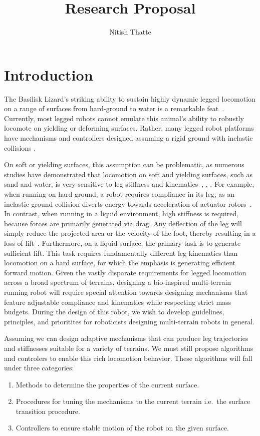 \documentclass{article}
\title{Research Proposal}
\author{Nitish Thatte}
\begin{document}
\maketitle

\section*{Introduction}
The Basilisk Lizard's striking ability to sustain highly dynamic legged locomotion on a range of surfaces from hard-ground to water is a remarkable feat~\cite{glasheen1996a}. Currently, most legged robots cannot emulate this animal's ability to robustly locomote on yielding or deforming surfaces. Rather, many legged robot platforms have mechanisms and controllers designed assuming a rigid ground with inelastic collisions \cite{phantom}. 

On soft or yielding surfaces, this assumption can be problematic, as numerous studies have demonstrated that locomotion on soft and yielding surfaces, such as sand and water, is very sensitive to leg stiffness and kinematics~\cite{Ferris1998}, \cite{Li2009}, \cite{Park2009}. For example, when running on hard ground, a robot requires compliance in its leg, as an inelastic ground collision diverts energy towards acceleration of actuator rotors~\cite{Hurst2005}. In contrast, when running in a liquid environment, high stiffness is required, because forces are primarily generated via drag. Any deflection of the leg will simply reduce the projected area or the velocity of the foot, thereby resulting in a loss of lift~\cite{Park2009}. Furthermore, on a liquid surface, the primary task is to generate sufficient lift. This task requires fundamentally different leg kinematics than locomotion on a hard surface, for which the emphasis is generating efficient forward motion. Given the vastly disparate requirements for legged locomotion across a broad spectrum of terrains, designing a bio-inspired multi-terrain running robot will require special attention towards designing mechanisms that feature adjustable compliance and kinematics while respecting strict mass budgets. During the design of this robot, we wish to develop guidelines, principles, and prioritites for roboticists designing multi-terrain robots in general.

Assuming we can design adaptive mechanisms that can produce leg trajectories and stiffnesses suitable for a variety of terrains. We must still propose algorithms and controlers to enable this rich locomotion behavior. These algorithms will fall under three categories:

\begin{enumerate}
	\item Methods to determine the properties of the current surface.
	\item Procedures for tuning the mechanisms to the current terrain i.e.\ the surface transition procedure.
	\item Controllers to ensure stable motion of the robot on the given surface.
\end{enumerate}





\end{document}
